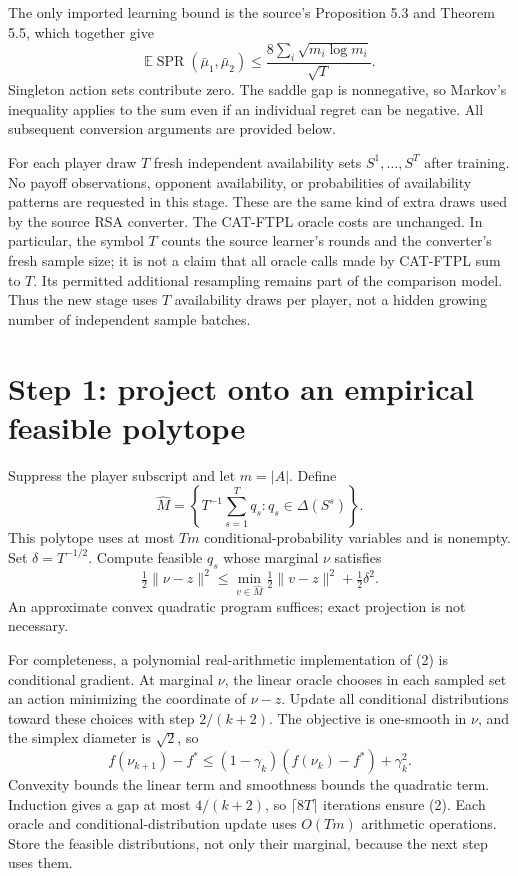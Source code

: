 \documentclass[11pt,a4paper]{article}
\newcommand{\E}{\mathbb E}
\begin{document}
The only imported learning bound is the source's Proposition 5.3 and Theorem 5.5, which together give
\[
 \E\operatorname{SPR}(\bar\mu_1,\bar\mu_2)
 \le \frac{8\sum_i\sqrt{m_i\log m_i}}{\sqrt T}. \tag{1}
\]
Singleton action sets contribute zero. The saddle gap is nonnegative, so Markov's inequality applies to the sum even if an individual regret can be negative. All subsequent conversion arguments are provided below.

For each player draw $T$ fresh independent availability sets $S^1,\ldots,S^T$ after training. No payoff observations, opponent availability, or probabilities of availability patterns are requested in this stage. These are the same kind of extra draws used by the source RSA converter. The CAT-FTPL oracle costs are unchanged. In particular, the symbol $T$ counts the source learner's rounds and the converter's fresh sample size; it is not a claim that all oracle calls made by CAT-FTPL sum to $T$. Its permitted additional resampling remains part of the comparison model. Thus the new stage uses $T$ availability draws per player, not a hidden growing number of independent sample batches.

\section{Step 1: project onto an empirical feasible polytope}
Suppress the player subscript and let $m=|A|$. Define
\[
 \widehat M=\left\{T^{-1}\sum_{s=1}^Tq_s:
       q_s\in\Delta(S^s)\right\}.
\]
This polytope uses at most $Tm$ conditional-probability variables and is nonempty. Set $\delta=T^{-1/2}$. Compute feasible $q_s$ whose marginal $\nu$ satisfies
\[
 \tfrac12\|\nu-z\|^2
 \le \min_{v\in\widehat M}\tfrac12\|v-z\|^2+\tfrac12\delta^2. \tag{2}
\]
An approximate convex quadratic program suffices; exact projection is not necessary.

For completeness, a polynomial real-arithmetic implementation of (2) is conditional gradient. At marginal $\nu$, the linear oracle chooses in each sampled set an action minimizing the coordinate of $\nu-z$. Update all conditional distributions toward these choices with step $2/(k+2)$. The objective is one-smooth in $\nu$, and the simplex diameter is $\sqrt2$, so
\[
 f(\nu_{k+1})-f^*\le(1-\gamma_k)(f(\nu_k)-f^*)+\gamma_k^2.
\]
Convexity bounds the linear term and smoothness bounds the quadratic term. Induction gives a gap at most $4/(k+2)$, so $\lceil8T\rceil$ iterations ensure (2). Each oracle and conditional-distribution update uses $O(Tm)$ arithmetic operations. Store the feasible distributions, not only their marginal, because the next step uses them.
\end{document}
